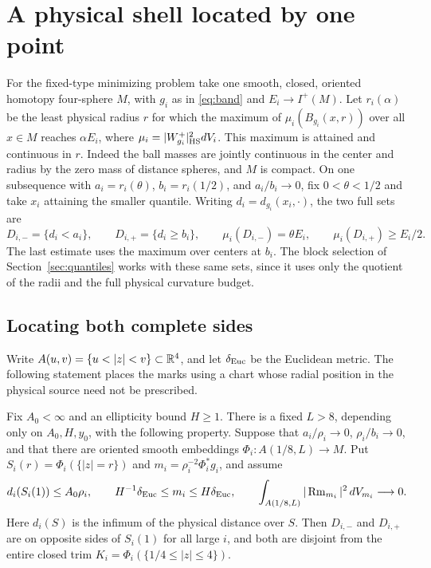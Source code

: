 \section{A physical shell located by one point}\label{sec:anchored-shell}

For the fixed-type minimizing problem take one smooth, closed,
oriented homotopy four-sphere \(M\), with \(g_i\) as in
\eqref{eq:band} and \(E_i\to I^+(M)\). Let \(r_i(\alpha)\) be
the least physical radius \(r\) for which the maximum of
\(\mu_i(B_{g_i}(x,r))\) over all \(x\in M\) reaches \(\alpha E_i\),
where \(\mu_i=|W^+_{g_i}|_{\rm HS}^2dV_i\). This maximum is
attained and continuous in \(r\). Indeed the ball masses are
jointly continuous in the center and radius by the zero mass of
distance spheres, and \(M\) is compact. On one subsequence with
\(a_i=r_i(\theta)\), \(b_i=r_i(1/2)\), and \(a_i/b_i\to0\), fix
\(0<\theta<1/2\) and take \(x_i\) attaining the smaller quantile.
Writing \(d_i=d_{g_i}(x_i,\cdot)\), the two full sets are
\begin{equation}\label{eq:anchored-marks}
 D_{i,-}=\{d_i<a_i\},\qquad D_{i,+}=\{d_i\ge b_i\},\qquad
 \mu_i(D_{i,-})=\theta E_i,\qquad \mu_i(D_{i,+})\ge E_i/2.
\end{equation}
The last estimate uses the maximum over centers at \(b_i\).
The block selection of Section~\ref{sec:quantiles} works with
these same sets, since it uses only the quotient of the radii
and the full physical curvature budget.

\subsection{Locating both complete sides}

Write \(A(u,v)=\{u<|z|<v\}\subset\R^4\), and let
\(\delta_{\rm Euc}\) be the Euclidean metric. The following
statement places the marks using a chart whose radial
position in the physical source need not be prescribed.

\begin{proposition}\label{prop:anchored-marking}
Fix \(A_0<\infty\) and an ellipticity bound \(H\ge1\). There is a
fixed \(L>8\), depending only on \(A_0,H,y_0\), with the following
property. Suppose that \(a_i/\rho_i\to0\), \(\rho_i/b_i\to0\), and
that there are oriented smooth embeddings
\(\Phi_i:A(1/8,L)\to M\). Put \(S_i(r)=\Phi_i(\{|z|=r\})\) and
\(m_i=\rho_i^{-2}\Phi_i^*g_i\), and assume
\begin{equation}\label{eq:anchored-wide-data}
 d_i(S_i(1))\le A_0\rho_i,\qquad
 H^{-1}\delta_{\rm Euc}\le m_i\le H\delta_{\rm Euc},\qquad
 \int_{A(1/8,L)}|\operatorname{Rm}_{m_i}|^2\,dV_{m_i}\longrightarrow0.
\end{equation}
Here \(d_i(S)\) is the infimum of the physical distance over \(S\).
Then \(D_{i,-}\) and \(D_{i,+}\) are on opposite sides of \(S_i(1)\)
for all large \(i\), and both are disjoint from the entire closed
trim \(K_i=\Phi_i(\{1/4\le|z|\le4\})\).
\end{proposition}

